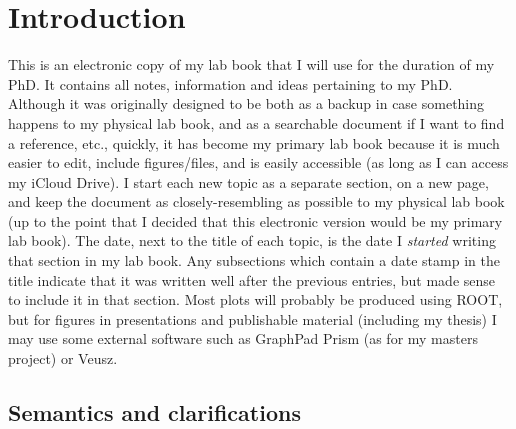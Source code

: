 \chapter{Introduction}
\label{sec:introduction}

This is an electronic copy of my lab book that I will use for the duration of my PhD. It contains all notes, information and ideas pertaining to my PhD. Although it was originally designed to be both as a backup in case something happens to my physical lab book, and as a searchable document if I want to find a reference, etc., quickly, it has become my primary lab book because it is much easier to edit, include figures/files, and is easily accessible (as long as I can access my iCloud Drive). I start each new topic as a separate section, on a new page, and keep the document as closely-resembling as possible to my physical lab book (up to the point that I decided that this electronic version would be my primary lab book). The date, next to the title of each topic, is the date I \emph{started} writing that section in my lab book. Any subsections which contain a date stamp in the title indicate that it was written well after the previous entries, but made sense to include it in that section. Most plots will probably be produced using ROOT, but for figures in presentations and publishable material (including my thesis) I may use some external software such as GraphPad Prism (as for my masters project) or Veusz.

\section{Semantics and clarifications}

